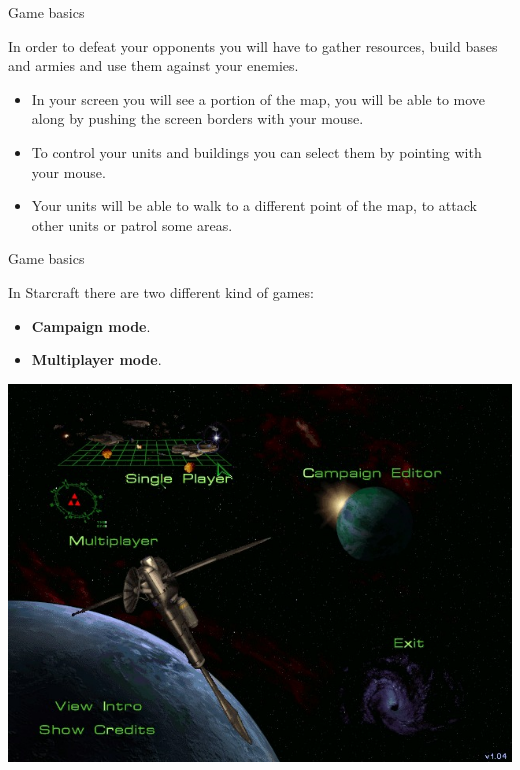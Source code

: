 \documentclass[10pt]{beamer}
\begin{document}
\begin{frame}{Game basics}

In order to defeat your opponents you will have to gather resources, build bases and armies and use them against your enemies.

\begin{itemize}
     \item In your screen you will see a portion of the map, you will be able to move along by pushing the screen borders with your mouse.
     \item To control your units and buildings you can select them by pointing with your mouse.
     \item Your units will be able to walk to a different point of the map, to attack other units or patrol some areas.
    \end{itemize}

\end{frame}

\begin{frame}{Game basics}

In Starcraft there are two different kind of games:

    \begin{itemize}
     \item \textbf{Campaign mode}.

    \item \textbf{Multiplayer mode}.
    \end{itemize}

\begin{center}
	  \includegraphics[scale=0.3]{menu.jpg}
\end{center}
\end{frame}
\end{document}
